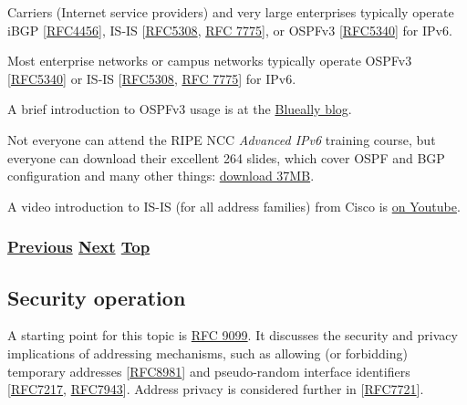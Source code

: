 \documentclass[
]{article}
\begin{document}
Carriers (Internet service providers) and very large enterprises
typically operate iBGP
{[}\href{https://www.rfc-editor.org/info/rfc4456}{RFC4456}{]}, IS-IS
{[}\href{https://www.rfc-editor.org/info/rfc5308}{RFC5308},
\href{https://www.rfc-editor.org/info/rfc7775}{RFC 7775}{]}, or OSPFv3
{[}\href{https://www.rfc-editor.org/info/rfc5340}{RFC5340}{]} for IPv6.

Most enterprise networks or campus networks typically operate OSPFv3
{[}\href{https://www.rfc-editor.org/info/rfc5340}{RFC5340}{]} or IS-IS
{[}\href{https://www.rfc-editor.org/info/rfc5308}{RFC5308},
\href{https://www.rfc-editor.org/info/rfc7775}{RFC 7775}{]} for IPv6.

A brief introduction to OSPFv3 usage is at the
\href{https://www.blueally.com/ipv6-deployment-series-part-3-ospfv3/}{Blueally
blog}.

Not everyone can attend the RIPE NCC \emph{Advanced IPv6} training
course, but everyone can download their excellent 264 slides, which
cover OSPF and BGP configuration and many other things:
\href{https://www.ripe.net/documents/3822/AdvancedIPv6-Slides_xDUF4U9.pdf}{download
37MB}.

A video introduction to IS-IS (for all address families) from Cisco is
\href{https://youtu.be/jWdD8SCwzHk}{on Youtube}.

\subsubsection{\texorpdfstring{\hyperref[benchmarking-and-monitoring]{Previous}
\hyperref[security-operation]{Next}
\hyperref[management-and-operations]{Top}}{Previous Next Top}}\label{previous-next-top-28}

\pagebreak

\subsection{Security operation}\label{security-operation}

A starting point for this topic is
\href{https://www.rfc-editor.org/info/rfc9099}{RFC 9099}. It discusses
the security and privacy implications of addressing mechanisms, such as
allowing (or forbidding) temporary addresses
{[}\href{https://www.rfc-editor.org/info/rfc8981}{RFC8981}{]} and
pseudo-random interface identifiers
{[}\href{https://www.rfc-editor.org/info/rfc7217}{RFC7217},
\href{https://www.rfc-editor.org/info/rfc7943}{RFC7943}{]}. Address
privacy is considered further in
{[}\href{https://www.rfc-editor.org/info/rfc7721}{RFC7721}{]}.
\end{document}
